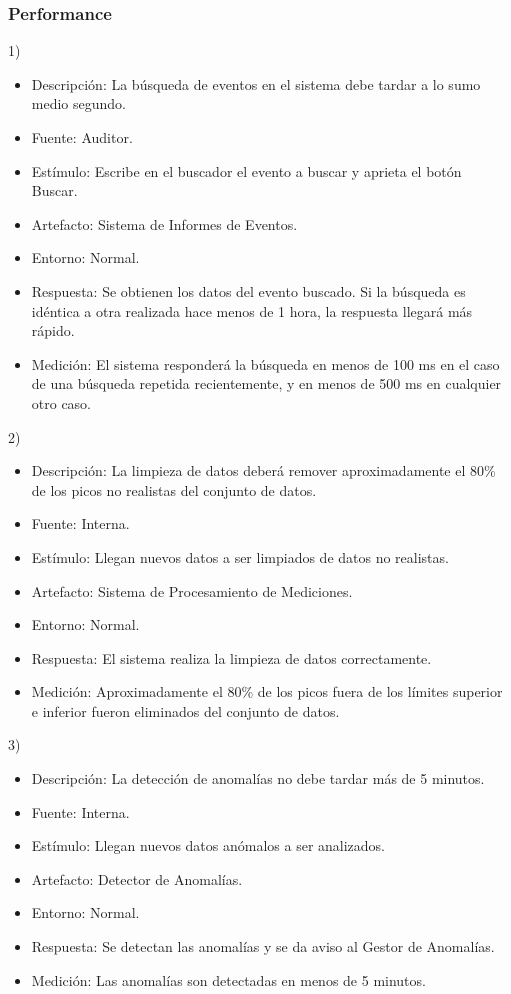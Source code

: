 \documentclass{article}
\theoremstyle{definition}
\theoremstyle{remark}
\begin{document}
\subsubsection{Performance}

1)
\begin{itemize}
  \item Descripción: La búsqueda de eventos en el sistema debe tardar a lo sumo medio segundo.
  \item Fuente: Auditor.
  \item Estímulo: Escribe en el buscador el evento a buscar y aprieta el botón Buscar.
  \item Artefacto: Sistema de Informes de Eventos.
  \item Entorno: Normal.
  \item Respuesta: Se obtienen los datos del evento buscado. Si la búsqueda es idéntica a otra realizada hace menos de 1 hora, la respuesta llegará más rápido.
  \item Medición: El sistema responderá la búsqueda en menos de 100 ms en el caso de una búsqueda repetida recientemente, y en menos de 500 ms en cualquier otro caso.
\end{itemize}

2)
\begin{itemize}
  \item Descripción: La limpieza de datos deberá remover aproximadamente el 80\% de los picos no realistas del conjunto de datos.
  \item Fuente: Interna. %
  \item Estímulo: Llegan nuevos datos a ser limpiados de datos no realistas. %
  \item Artefacto: Sistema de Procesamiento de Mediciones. %
  \item Entorno: Normal.
  \item Respuesta: El sistema realiza la limpieza de datos correctamente.
  \item Medición: Aproximadamente el 80\% de los picos fuera de los límites superior e inferior fueron eliminados del conjunto de datos.
\end{itemize}

3)
\begin{itemize}
  \item Descripción: La detección de anomalías no debe tardar más de 5 minutos.
  \item Fuente: Interna.
  \item Estímulo: Llegan nuevos datos anómalos a ser analizados.
  \item Artefacto: Detector de Anomalías.
  \item Entorno: Normal.
  \item Respuesta: Se detectan las anomalías y se da aviso al Gestor de Anomalías.
  \item Medición: Las anomalías son detectadas en menos de 5 minutos.
\end{itemize}
\end{document}
